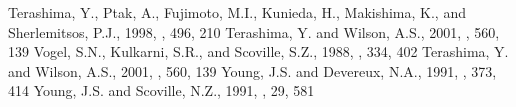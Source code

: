 \documentclass[manuscript]{aastex}
\begin{document}
\begin{thebibliography}{}
 Terashima, Y., Ptak, A., Fujimoto, M.I., Kunieda, H., Makishima, K., and Sherlemitsos, P.J., 1998, \apj, 496, 210
 Terashima, Y. and Wilson, A.S., 2001, \apj, 560, 139
 Vogel, S.N., Kulkarni, S.R., and Scoville, S.Z., 1988, \nat, 334, 402
 Terashima, Y. and Wilson, A.S., 2001, \apj, 560, 139
 Young, J.S. and Devereux, N.A., 1991, \apj, 373, 414
 Young, J.S. and Scoville, N.Z., 1991, \araa, 29, 581
\end{thebibliography}

\clearpage
\end{document}
